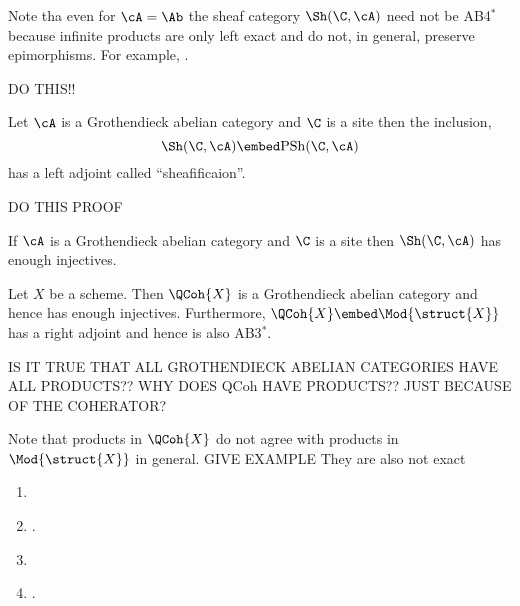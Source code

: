 \documentclass[12pt]{article}
\begin{document}
\begin{rmk}
Note tha even for $\cA = \Ab$ the sheaf category $\Sh(\C, \cA)$ need not be AB4$^*$ because infinite products are only left exact and do not, in general, preserve epimorphisms. For example, .
\end{rmk}

DO THIS!!

\begin{theorem}
Let $\cA$ is a Grothendieck abelian category and $\C$ is a site then the inclusion,
\[ \Sh(\C, \cA) \embed \PSh(\C, \cA) \]
has a left adjoint called ``sheafificaion''. 
\end{theorem}

DO THIS PROOF

\begin{cor}
If $\cA$ is a Grothendieck abelian category and $\C$ is a site then $\Sh(\C, \cA)$ has enough injectives. 
\end{cor}

\begin{theorem}
Let $X$ be a scheme. Then $\QCoh{X}$ is a Grothendieck abelian category and hence has enough injectives. Furthermore, $\QCoh{X} \embed \Mod{\struct{X}}$ has a right adjoint and hence is also AB3$^*$. 
\end{theorem}

IS IT TRUE THAT ALL GROTHENDIECK ABELIAN CATEGORIES HAVE ALL PRODUCTS?? WHY DOES QCoh HAVE PRODUCTS?? JUST BECAUSE OF THE COHERATOR?

\begin{rmk}
Note that products in $\QCoh{X}$ do not agree with products in $\Mod{\struct{X}}$ in general. GIVE EXAMPLE They are also not exact 
\end{rmk}

\begin{enumerate}
\item {}
\item {}.

\item {}

\item {}.
\end{enumerate}
\end{document}
